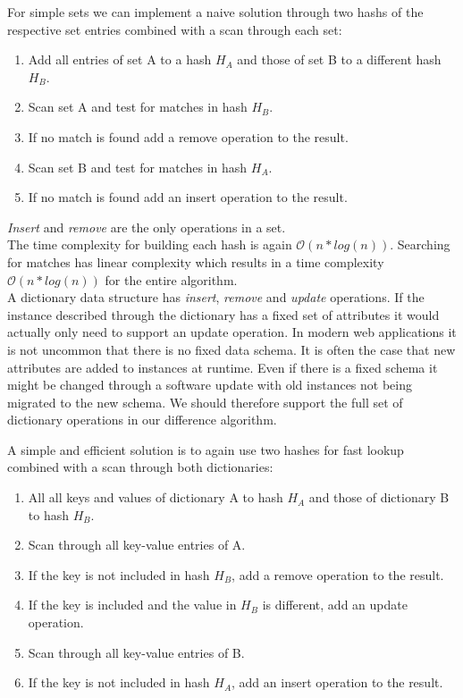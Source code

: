 For simple sets we can implement a naive solution through two hashs of the respective set entries combined with a scan through each set:

\begin{enumerate}
\item Add all entries of set A to a hash $ H_A $ and those of set B to a different hash $ H_B $.
\item Scan set A and test for matches in hash $ H_B $.
\item If no match is found add a remove operation to the result.
\item Scan set B and test for matches in hash $ H_A $.
\item If no match is found add an insert operation to the result.
\end{enumerate}

\emph{Insert} and \emph{remove} are the only operations in a set.\\
The time complexity for building each hash is again $ \mathcal O(n * log(n)) $.
Searching for matches has linear complexity which results in a time complexity $ \mathcal O(n * log(n)) $ for the entire algorithm.\\

A dictionary data structure has \emph{insert}, \emph{remove} and \emph{update} operations.
If the instance described through the dictionary has a fixed set of attributes it would actually only need to support an update operation.
In modern web applications it is not uncommon that there is no fixed data schema.
It is often the case that new attributes are added to instances at runtime.
Even if there is a fixed schema it might be changed through a software update with old instances not being migrated to the new schema.
We should therefore support the full set of dictionary operations in our difference algorithm.

A simple and efficient solution is to again use two hashes for fast lookup combined with a scan through both dictionaries:

\begin{enumerate}
\item All all keys and values of dictionary A to hash $ H_A $ and those of dictionary B to hash $ H_B $.
\item Scan through all key-value entries of A.
\item If the key is not included in hash $ H_B $, add a remove operation to the result.
\item If the key is included and the value in $ H_B $ is different, add an update operation.
\item Scan through all key-value entries of B.
\item If the key is not included in hash $ H_A $, add an insert operation to the result.
\end{enumerate}


